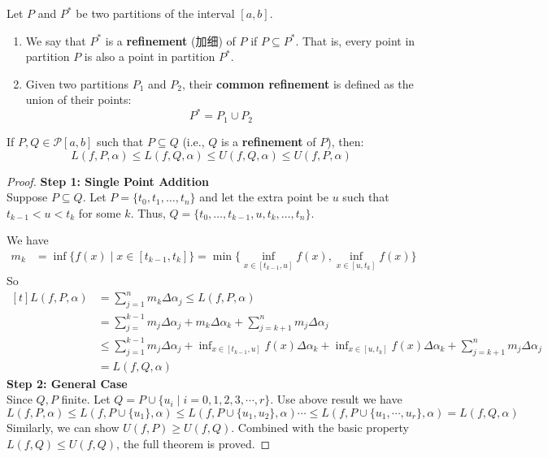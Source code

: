 \documentclass[
	UTF-8,
	11pt, %
	a4paper, %
]{LegrandOrangeBook}
\begin{document}
    \begin{definition}[Refinement]
    Let $P$ and $P^*$ be two partitions of the interval $[a, b]$.
    \begin{enumerate}
        \item We say that $P^*$ is a \textbf{refinement} (加细) of $P$ if $P \subseteq P^*$. That is, every point in partition $P$ is also a point in partition $P^*$.
        \item Given two partitions $P_1$ and $P_2$, their \textbf{common refinement} is defined as the union of their points:
        \[ P^* = P_1 \cup P_2 \]
    \end{enumerate}
    \end{definition}

    \begin{theorem}
    If $P,Q \in \mathcal{P}[a,b]$ such that $P \subseteq Q$ (i.e., $Q$ is a \textbf{refinement} of $P$), then:
    \[ L(f, P, \alpha) \le L(f, Q, \alpha) \le U(f, Q, \alpha) \le U(f, P, \alpha) \]
    \end{theorem}

    \begin{proof}
    \textbf{Step 1: Single Point Addition} \\
    Suppose $P \subseteq Q$. Let $P = \{t_0, t_1, \dots, t_n\}$ and 
    let the extra point be $u$ such that $t_{k-1} < u < t_k$ for some $k$.
    Thus, $Q = \{t_0, \dots, t_{k-1}, u, t_k, \dots, t_n\}$.

    We have
    \begin{align*}
        m_k &= \inf \{ f(x) \mid x \in [t_{k-1}, t_k] \} = \min \{\inf_{ x \in [t_{k-1}, u ]}  f(x),  \inf_{ x \in [u , t_k]}  f(x) \}
    \end{align*}
    So
    $
    \begin{aligned}[t]
            L(f,P, \alpha) &= \sum_{j=1}^{n}m_k \Delta \alpha_j \leq L(f,P, \alpha) \\
                            &= \sum_{j=}^{k-1}m_j \Delta \alpha_j + m_k \Delta \alpha_k + \sum^{n}_{j=k+1}m_j \Delta \alpha_j \\
                            &\leq \sum_{j=1}^{k-1}m_j \Delta \alpha_j 
                            + \inf_{ x \in [t_{k-1}, u ]}  f(x) \Delta \alpha_k 
                            + \inf_{ x \in [u , t_k]}  f(x) \Delta \alpha_k 
                            + \sum^{n}_{j=k+1}m_j \Delta \alpha_j \\
                            &= L(f,Q, \alpha)
    \end{aligned}
    $\\

    \textbf{Step 2: General Case} \\
    Since $Q, P$ finite. Let $Q =P \cup \{u_i \mid i = 0,1,2,3,\cdots , r \}$. Use above result we have
    \[
    L(f, P,\alpha) \leq L(f, P \cup \{u_1\},\alpha) \leq L(f, P \cup \{u_1,u_2\},\alpha) \cdots \leq L(f, P \cup \{u_1,\cdots,u_r\},\alpha)= L(f, Q,\alpha)
    \]
    Similarly, we can show $U(f, P) \ge U(f, Q)$. Combined with the basic property $L(f, Q) \le U(f, Q)$, the full theorem is proved.
    \end{proof}
\end{document}
